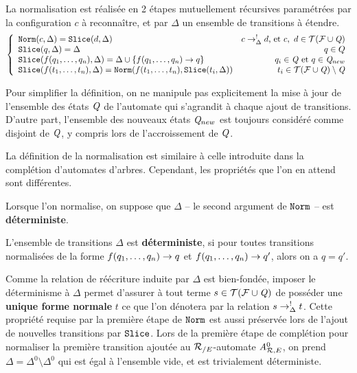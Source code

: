 
\begin{definition}[Normalisation]
  \label{def:normalisation}
  La normalisation est réalisée en 2 étapes mutuellement récursives
  paramétrées par la configuration $c$ à reconnaître, et par $\Delta$ un ensemble de
  transitions à étendre.
  \[
  \left\{
    \begin{array}{lr}
      \mathtt{Norm}(c, \Delta) = \mathtt{Slice}(d, \Delta) & c \rightarrow^!_\Delta d\textrm{, et }c,\ d \in \mathcal{ T(F \cup \mathit Q)}\\
      \mathtt{Slice}(q,\Delta) = \Delta & q \in Q\\
      \mathtt{Slice}(f(q_1,\dots, q_n), \Delta) = \Delta \cup \{f(q_1,\dots, q_n) \rightarrow q\} & q_i \in \mathit Q\textrm{ et }q \in \mathit Q_{new}\\
      \mathtt{Slice}(f(t_1,\dots, t_n), \Delta) = \mathtt{Norm}(f(t_1,\dots, t_n), \mathtt{Slice}(t_i, \Delta)) & t_i \in \mathcal{ T(F \cup \mathit Q)} \setminus \mathit Q\\
    \end{array}
  \right.
  \]
\end{definition}

\noindent
Pour simplifier la définition, on ne manipule pas explicitement la mise à jour de l'ensemble des états $\mathit Q$ de l'automate 
qui s'agrandit à chaque ajout de transitions. D'autre part, l'ensemble des nouveaux états $\mathit Q_{new}$ est toujours considéré
comme disjoint de $\mathit Q$, y compris lors de l'accroissement de $\mathit Q$.

La définition de la normalisation est similaire à celle introduite dans la complétion d'automates d'arbres.
Cependant, les propriétés que l'on en attend sont différentes.

Lorsque l'on normalise, on suppose que $\Delta$ -- le second argument de $\mathtt{Norm}$ -- est \textbf{déterministe}.

\begin{definition}
L'ensemble de transitions $\Delta$ est \textbf{déterministe}, si pour 
toutes transitions normalisées de la forme $f(q_1, \dots, q_n) \rightarrow q$ et
$f(q_1, \dots, q_n) \rightarrow q'$, alors on a $q = q'$.
\end{definition}

Comme la relation de réécriture induite par $\Delta$ est bien-fondée,
imposer le déterminisme à $\Delta$ permet d'assurer à tout terme $s
\in \mathcal{ T(F \cup \mathit Q)}$ de posséder une \textbf{unique forme normale} $t$ ce que l'on dénotera
par la relation $s \rightarrow_\Delta^! t$.  Cette propriété requise par la
première étape de $\mathtt{Norm}$ est aussi préservée lors de l'ajout de nouvelles transitions par $\mathtt{Slice}$.
Lors de la première étape de complétion pour normaliser la première transition ajoutée
au ${\mathcal R_{/E}}$-automate ${\mathit A}_{\mathcal R,E}^0$, on prend $\Delta = \Delta^0 \setminus \Delta^0$ qui est
égal à l'ensemble vide, et est trivialement déterministe.

